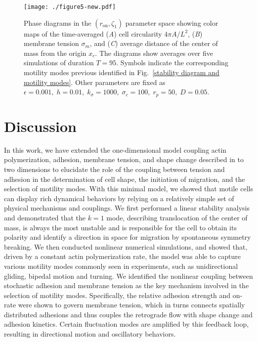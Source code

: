 \documentclass[12pt]{article}
\begin{document}
        \begin{figure*}[t]
            \centering
            \texttt{[image: ./figure5-new.pdf]}
            \caption{Phase diagrams in the $(r_{\text{on}},\zeta_1)$ parameter space showing color maps of the time-averaged (\textit{A}) cell circularity $4\pi A/ L^2$, (\textit{B}) membrane tension $\sigma_m$, and (\textit{C}) average distance of the center of mass from the origin $x_c$. The diagrams show averages over five simulations of duration $T=95$. Symbols indicate the corresponding motility modes previous identified in Fig.~\ref{stability diagram and motility modes}. 
            Other parameters are fixed as $\epsilon = 0.001,\;h=0.01,\;k_\sigma=1000,\;\sigma_c=100,\;r_p=50,\;D=0.05$.} 
            \label{phase diagrams}
        \end{figure*}
        
        
        
        
        \section*{Discussion}
        
        In this work, we have extended the one-dimensional model coupling actin polymerization, adhesion, membrane tension, and shape change described in \cite{sens2020stick} to two dimensions to elucidate the role of the coupling between tension and adhesion in the determination of cell shape, the initiation of migration, and the selection of motility modes. 
        With this minimal model, we showed that motile cells can display rich dynamical behaviors by relying on a relatively simple set of physical mechanisms and couplings. 
        We first performed a linear stability analysis and demonstrated that the $k=1$ mode, describing translocation of the center of mass, is always the most unstable and is responsible for the cell to obtain its polarity and identify a direction in space for migration by spontaneous symmetry breaking. 
        We then conducted nonlinear numerical simulations, and showed that, driven by a constant actin polymerization rate, the model was able to capture various motility modes commonly seen in experiments, such as unidirectional gliding, bipedal motion and turning. 
        We identified the nonlinear coupling between stochastic adhesion and membrane tension as the key mechanism involved in the selection of motility modes. Specifically, the relative adhesion strength and on-rate were shown to govern membrane tension, which in turns connects spatially distributed adhesions and thus couples the retrograde flow with shape change and adhesion kinetics. 
        Certain fluctuation modes are amplified by this feedback loop, resulting in directional motion and oscillatory behaviors. 
        
\end{document}
